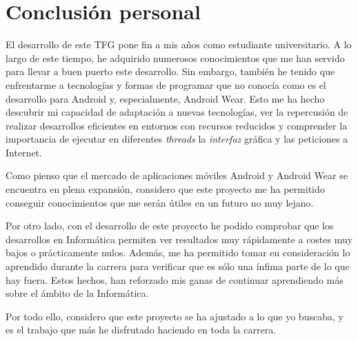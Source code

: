 \chapter{Conclusión personal}
\label{chap:conclusionesPersonales}

El desarrollo de este \acs{TFG} pone fin a mis años como estudiante universitario. A lo largo de
este tiempo, he adquirido numerosos conocimientos que me han servido para llevar a buen puerto este
desarrollo. Sin embargo, también he tenido que enfrentarme a tecnologías y formas de programar que
no conocía como es el desarrollo para Android y, especialmente, Android Wear. Esto me ha hecho
descubrir mi capacidad de adaptación a nuevas tecnologías, ver la repercusión de realizar
desarrollos eficientes en entornos con recursos reducidos y comprender la importancia de ejecutar en
diferentes \emph{threads} la \emph{interfaz} gráfica y las peticiones a Internet.

Como pienso que el mercado de aplicaciones móviles Android y Android Wear se encuentra en plena
expansión, considero que este proyecto me ha permitido conseguir conocimientos que me serán útiles
en un futuro no muy lejano. 

Por otro lado, con el desarrollo de este proyecto he podido comprobar que los desarrollos en
Informática permiten ver resultados muy rápidamente a costes muy bajos o prácticamente
nulos. Además, me ha permitido tomar en consideración lo aprendido durante la carrera para verificar
que es sólo una ínfima parte de lo que hay fuera. Estos hechos, han reforzado mis ganas de continuar
aprendiendo más sobre el ámbito de la Informática.

Por todo ello, considero que este proyecto se ha ajustado a lo que yo buscaba, y es el trabajo que
más he disfrutado haciendo en toda la carrera.

